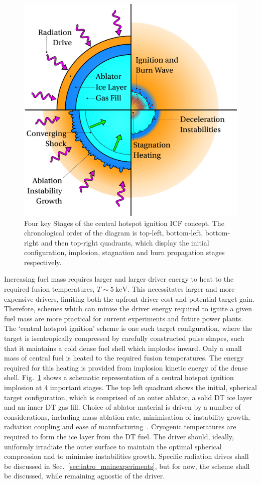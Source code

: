 \begin{figure}[t!]
    \includegraphics[width=0.7\linewidth]{Introduction/Images/hotspot ignition white.png}
    \centering
    \caption{Four key Stages of the central hotspot ignition \ac{ICF} concept.
    The chronological order of the diagram is top-left, bottom-left, bottom-right and then top-right quadrants, which display the initial configuration, implosion, stagnation and burn propagation stages respectively.
    }%
    \label{fig:intro_hotspot}
\end{figure}

Increasing fuel mass requires larger and larger driver energy to heat to the required fusion temperatures, $T\sim5\ \text{keV}$.
This necessitates larger and more expensive drivers, limiting both the upfront driver cost and potential target gain.
Therefore, schemes which can minise the driver energy required to ignite a given fuel mass are more practical for current experiments and future power plants.
The `central hotspot ignition' scheme is one such target configuration, where the target is isentropically compressed by carefully constructed pulse shapes, such that it maintains a cold dense fuel shell which implodes inward.
Only a small mass of central fuel is heated to the required fusion temperatures.
The energy required for this heating is provided from implosion kinetic energy of the dense shell.
Fig.~\ref{fig:intro_hotspot} shows a schematic representation of a central hotspot ignition implosion at 4 important stages.
The top left quadrant shows the initial, spherical target configuration, which is comprised of an outer ablator, a solid DT ice layer and an inner DT gas fill.
Choice of ablator material is driven by a number of considerations, including mass ablation rate, minimisation of instability growth, radiation coupling and ease of manufacturing~\cite{lafon_direct-driveignition_2015,kline_first_2016,hu_laser-direct-drive_2023,casey_performance_2015}.
Cryogenic temperatures are required to form the ice layer from the DT fuel.
The driver should, ideally, uniformly irradiate the outer surface to maintain the optimal spherical compression and to minimise instabilities growth.
Specific radiation drives shall be discussed in Sec.~\ref{sec:intro_mainexperiments}, but for now, the scheme shall be discussed, while remaining agnostic of the driver.


